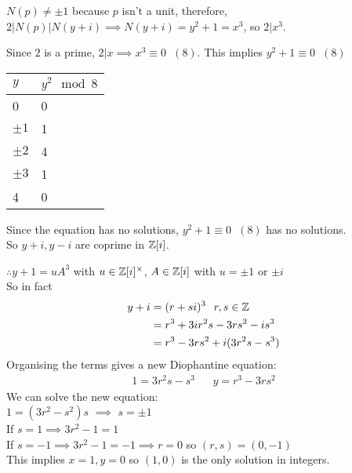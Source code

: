 \documentclass[11pt]{article}
\begin{document}
	$N(p) \neq \pm 1$ because $p$ isn't a unit, therefore,  $ 2|N(p)|N(y+i) \implies N(y+i) = y^2+1 = x^3$, so $2| x^3$.

	Since $2$ is a prime, $2|x \implies x^3 \equiv 0 \hspace{7pt} (8)$. This implies $y^2 + 1 \equiv 0\hspace{7pt} (8) $


\begin{center}

\begin{tabular}{l|l}
\hline
$y$       & $y^2 \mod 8 $ \\ \hline
0       & 0             \\ 
$\pm 1$ & 1             \\ 
$\pm 2$ & 4             \\ 
$\pm 3$ & 1             \\ 
4       & 0             \\ 
\end{tabular}

\end{center}
Since the equation has no solutions, $y^2 + 1 \equiv 0 \hspace{7pt} (8)$ has no solutions. 
$ $\\
So $y+i, y-i$ are coprime in $\mathbb{Z}[i]$.


$\therefore y+1 = uA^3$ with $u \in \mathbb{Z}[i]^\times $, $A \in \mathbb{Z}[i]$ with $u=\pm 1 $ or $\pm i$
$ $\\[1em]
So in fact
\begin{align*}
	y+i &= (r+si)^3 \hspace{7pt} r,s \in \mathbb{Z} \\
	& = r^3 + 3ir^2s - 3rs^2 - is^3\\
	& = r^3 - 3rs^2 + i(3r^2s - s^3)
\end{align*}
Organising the terms gives a new Diophantine equation:
\begin{align*}
	1= 3r^2s - s^3 && y = r^3 - 3rs^2
\end{align*}
We can solve the new equation: 
$ $\\[1em]
$1= (3r^2-s^2)s$ $\implies $ $s= \pm 1$
$ $\\[1em]
If $s=1 \implies 3r^2 - 1 =1 $ \lightning\\
If $s=-1 \implies 3r^2 - 1 = -1 \implies r =0 $ \hspace{7pt} so $(r,s) = (0,-1)$
$ $\\[1em]
This implies $x=1, y= 0$ so $(1,0)$ is the only solution in integers.
\end{document}
